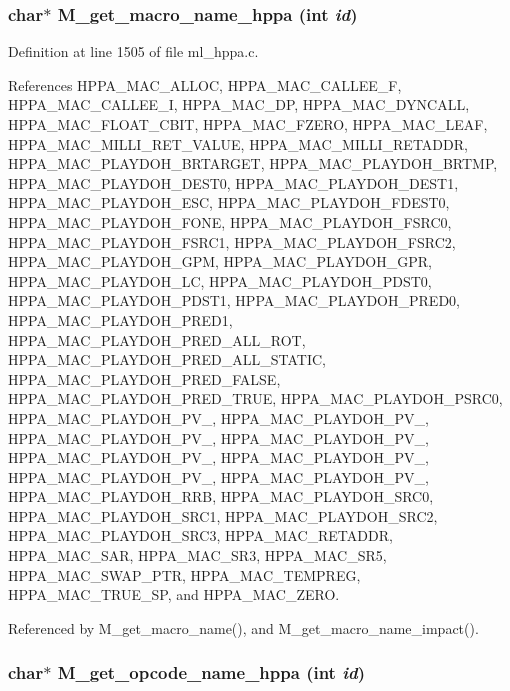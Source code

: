 \subsubsection{\setlength{\rightskip}{0pt plus 5cm}char$\ast$ M\_\-get\_\-macro\_\-name\_\-hppa (int {\em id})}\label{m__hppa_8h_0b30cc81838e5a277738d6b057200aa3}




Definition at line 1505 of file ml\_\-hppa.c.

References HPPA\_\-MAC\_\-ALLOC, HPPA\_\-MAC\_\-CALLEE\_\-F, HPPA\_\-MAC\_\-CALLEE\_\-I, HPPA\_\-MAC\_\-DP, HPPA\_\-MAC\_\-DYNCALL, HPPA\_\-MAC\_\-FLOAT\_\-CBIT, HPPA\_\-MAC\_\-FZERO, HPPA\_\-MAC\_\-LEAF, HPPA\_\-MAC\_\-MILLI\_\-RET\_\-VALUE, HPPA\_\-MAC\_\-MILLI\_\-RETADDR, HPPA\_\-MAC\_\-PLAYDOH\_\-BRTARGET, HPPA\_\-MAC\_\-PLAYDOH\_\-BRTMP, HPPA\_\-MAC\_\-PLAYDOH\_\-DEST0, HPPA\_\-MAC\_\-PLAYDOH\_\-DEST1, HPPA\_\-MAC\_\-PLAYDOH\_\-ESC, HPPA\_\-MAC\_\-PLAYDOH\_\-FDEST0, HPPA\_\-MAC\_\-PLAYDOH\_\-FONE, HPPA\_\-MAC\_\-PLAYDOH\_\-FSRC0, HPPA\_\-MAC\_\-PLAYDOH\_\-FSRC1, HPPA\_\-MAC\_\-PLAYDOH\_\-FSRC2, HPPA\_\-MAC\_\-PLAYDOH\_\-GPM, HPPA\_\-MAC\_\-PLAYDOH\_\-GPR, HPPA\_\-MAC\_\-PLAYDOH\_\-LC, HPPA\_\-MAC\_\-PLAYDOH\_\-PDST0, HPPA\_\-MAC\_\-PLAYDOH\_\-PDST1, HPPA\_\-MAC\_\-PLAYDOH\_\-PRED0, HPPA\_\-MAC\_\-PLAYDOH\_\-PRED1, HPPA\_\-MAC\_\-PLAYDOH\_\-PRED\_\-ALL\_\-ROT, HPPA\_\-MAC\_\-PLAYDOH\_\-PRED\_\-ALL\_\-STATIC, HPPA\_\-MAC\_\-PLAYDOH\_\-PRED\_\-FALSE, HPPA\_\-MAC\_\-PLAYDOH\_\-PRED\_\-TRUE, HPPA\_\-MAC\_\-PLAYDOH\_\-PSRC0, HPPA\_\-MAC\_\-PLAYDOH\_\-PV\_, HPPA\_\-MAC\_\-PLAYDOH\_\-PV\_, HPPA\_\-MAC\_\-PLAYDOH\_\-PV\_, HPPA\_\-MAC\_\-PLAYDOH\_\-PV\_, HPPA\_\-MAC\_\-PLAYDOH\_\-PV\_, HPPA\_\-MAC\_\-PLAYDOH\_\-PV\_, HPPA\_\-MAC\_\-PLAYDOH\_\-PV\_, HPPA\_\-MAC\_\-PLAYDOH\_\-PV\_, HPPA\_\-MAC\_\-PLAYDOH\_\-RRB, HPPA\_\-MAC\_\-PLAYDOH\_\-SRC0, HPPA\_\-MAC\_\-PLAYDOH\_\-SRC1, HPPA\_\-MAC\_\-PLAYDOH\_\-SRC2, HPPA\_\-MAC\_\-PLAYDOH\_\-SRC3, HPPA\_\-MAC\_\-RETADDR, HPPA\_\-MAC\_\-SAR, HPPA\_\-MAC\_\-SR3, HPPA\_\-MAC\_\-SR5, HPPA\_\-MAC\_\-SWAP\_\-PTR, HPPA\_\-MAC\_\-TEMPREG, HPPA\_\-MAC\_\-TRUE\_\-SP, and HPPA\_\-MAC\_\-ZERO.

Referenced by M\_\-get\_\-macro\_\-name(), and M\_\-get\_\-macro\_\-name\_\-impact().
\subsubsection{\setlength{\rightskip}{0pt plus 5cm}char$\ast$ M\_\-get\_\-opcode\_\-name\_\-hppa (int {\em id})}\label{m__hppa_8h_83e55e8fc37a7cf0577a46a663492b38}




